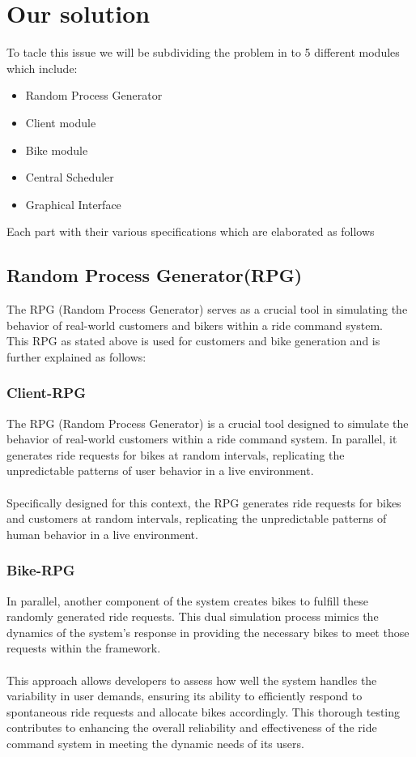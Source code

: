 \section{Our solution}
To tacle this issue we will be subdividing the problem in to 5 different modules which include:

\begin{itemize}
\item[\textbullet] Random Process Generator
\item[\textbullet] Client module
\item[\textbullet] Bike module
\item[\textbullet] Central Scheduler
\item[\textbullet] Graphical Interface
\end{itemize}

Each part with their various specifications which are elaborated as follows

\subsection{Random Process Generator(RPG)}
The RPG (Random Process Generator) serves as a crucial tool in simulating the behavior of real-world customers  and bikers within a ride command system.\\This RPG as stated above is used for customers and bike generation and is further explained as follows:

\subsubsection{Client-RPG}
The RPG (Random Process Generator) is a crucial tool designed to simulate the behavior of real-world customers within a ride command system. In parallel, it generates ride requests for bikes at random intervals, replicating the unpredictable patterns of user behavior in a live environment.\\\\Specifically designed for this context, the RPG generates ride requests for bikes and customers at random intervals, replicating the unpredictable patterns of human behavior in a live environment.

\subsubsection{Bike-RPG}
In parallel, another component of the system creates bikes to fulfill these randomly generated ride requests. This dual simulation process mimics the dynamics of the system's response in providing the necessary bikes to meet those requests within the framework.\\\\This approach allows developers to assess how well the system handles the variability in user demands, ensuring its ability to efficiently respond to spontaneous ride requests and allocate bikes accordingly. This thorough testing contributes to enhancing the overall reliability and effectiveness of the ride command system in meeting the dynamic needs of its users.

